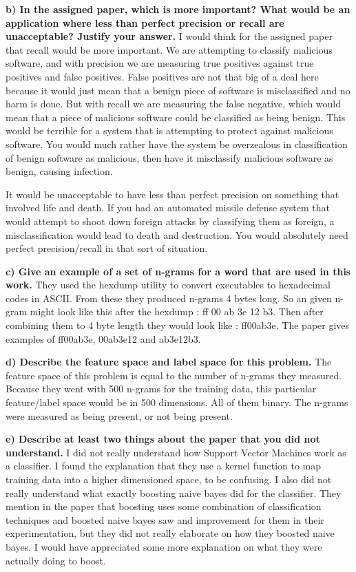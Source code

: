 \documentclass[11pt, oneside]{article}   	%
\begin{document}
	\textbf{b) In the assigned paper, which is more important? What would be an application where less than perfect precision 
	or recall are unacceptable? Justify your answer.}
	I would think for the assigned paper that recall would be more important. We are attempting to classify malicious software, and with precision we are measuring true positives against true positives and false positives. False positives are not that big of a deal here because it would just mean that a benign piece of software is misclassified and no harm is done. But with recall we are measuring the false negative, which would mean that a piece of malicious software could be classified as being benign. This would be terrible for a system that is attempting to protect against malicious software. You would much rather have the system be overzealous in classification of benign software as malicious, then have it misclassify malicious software as benign, causing infection. 
	
	It would be unacceptable to have less than perfect precision on something that involved life and death. If you had an automated missile defense system that would attempt to shoot down foreign attacks by classifying them as foreign, a misclassification would lead to death and destruction. You would absolutely need perfect precision/recall in that sort of situation. 
	
	\textbf{c) Give an example of a set of n-grams for a word that are used in this work.}
	They used the hexdump utility to convert executables to hexadecimal codes in ASCII. From these they produced n-grams 4 bytes long. So an given n-gram might look like this after the hexdump : ff 00 ab 3e 12 b3. Then after combining them to 4 byte length they would look like : ff00ab3e. The paper gives examples of ff00ab3e, 00ab3e12 and ab3e12b3. 
	
	\textbf{d) Describe the feature space and label space for this problem.}
	The feature space of this problem is equal to the number of n-grams they measured. Because they went with 500 n-grams for the training data, this particular feature/label space would be in 500 dimensions. All of them binary. The n-grams were measured as being present, or not being present. 
	
	\textbf{e) Describe at least two things about the paper that you did not understand.}
	I did not really understand how Support Vector Machines work as a classifier. I found the explanation that they use a kernel function to map training data into a higher dimensioned space, to be confusing. I also did not really understand what exactly boosting naive bayes did for the classifier. They mention in the paper that boosting uses some combination of classification techniques and boosted naive bayes saw and improvement for them in their experimentation, but they did not really elaborate on how they boosted naive bayes. I would have appreciated some more explanation on what they were actually doing to boost. 
	
\end{document}
